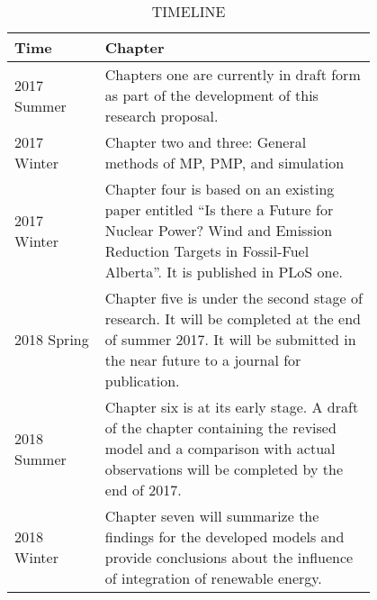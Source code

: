 \begin{table}[]
	\centering
	\caption{TIMELINE}
	\label{my-label}
    \begin{threeparttable}
\begin{tabular}{p{0.2\linewidth}p{0.6\linewidth}}
	\toprule
	Time & Chapter \\ \midrule
	2017 Summer & Chapters one are currently in draft form as part of the development of this research proposal. \\
	2017 Winter & Chapter two and three: General methods of MP, PMP, and simulation \\
	2017 Winter & Chapter four is based on an existing paper entitled “Is there a Future for Nuclear Power? Wind and Emission Reduction Targets in Fossil-Fuel Alberta”. It is published in PLoS one. \\
	2018 Spring & Chapter five is under the second stage of research. It will be completed at the end of summer 2017. It will be submitted in the near future to a journal for publication. \\
	2018 Summer & Chapter six is at its early stage. A draft of the chapter containing the revised model and a comparison with actual observations will be completed by the end of 2017. \\
	2018 Winter & Chapter seven will summarize the findings for the developed models and provide conclusions about the influence of integration of renewable energy. \\ \bottomrule
\end{tabular}
    \end{threeparttable}
\end{table}


	


